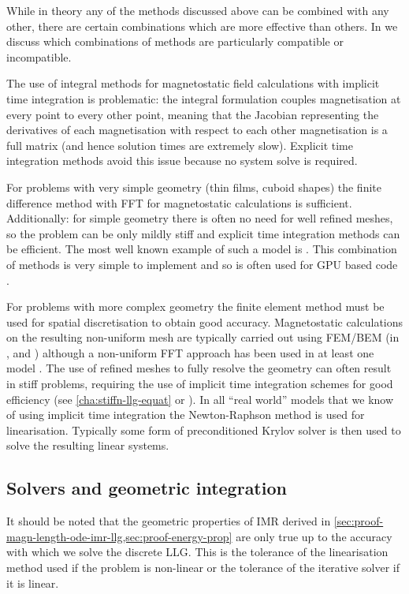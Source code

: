 While in theory any of the methods discussed above can be combined with any other, there are certain combinations which are more effective than others.
In  we discuss which combinations of methods are particularly compatible or incompatible.

The use of integral methods for magnetostatic field calculations with implicit time integration is problematic: the integral formulation couples magnetisation at every point to every other point, meaning that the Jacobian representing the derivatives of each magnetisation with respect to each other magnetisation is a full matrix (and hence solution times are extremely slow).
Explicit time integration methods avoid this issue because no system solve is required.

For problems with very simple geometry (\ie thin films, cuboid shapes) the finite difference method with FFT for magnetostatic calculations is sufficient.
Additionally: for simple geometry there is often no need for well refined meshes, so the problem can be only mildly stiff and explicit time integration methods can be efficient.
The most well known example of such a model is \oommf \cite{oommf-website}.
This combination of methods is very simple to implement and so is often used for GPU based code \cite{Vansteenkiste2011}.

For problems with more complex geometry the finite element method must be used for spatial discretisation to obtain good accuracy.
Magnetostatic calculations on the resulting non-uniform mesh are typically carried out using FEM/BEM (\eg in \nmag \cite{Fischbacher2007}, \magpar \cite{Scholz2003} and \femme) although a non-uniform FFT approach has been used in at least one model \cite{Chang2011}.
The use of refined meshes to fully resolve the geometry can often result in stiff problems, requiring the use of implicit time integration schemes for good efficiency (see \cref{cha:stiffn-llg-equat} or \cite{Shepherd2014}).
In all ``real world'' models that we know of using implicit time integration the Newton-Raphson method is used for linearisation.
Typically some form of preconditioned Krylov solver is then used to solve the resulting linear systems.


\subsection{Solvers and geometric integration}

It should be noted that the geometric properties of IMR derived in \cref{sec:proof-magn-length-ode-imr-llg,sec:proof-energy-prop} are only true up to the accuracy with which we solve the discrete LLG.
This is the tolerance of the linearisation method used if the problem is non-linear or the tolerance of the iterative solver if it is linear.

